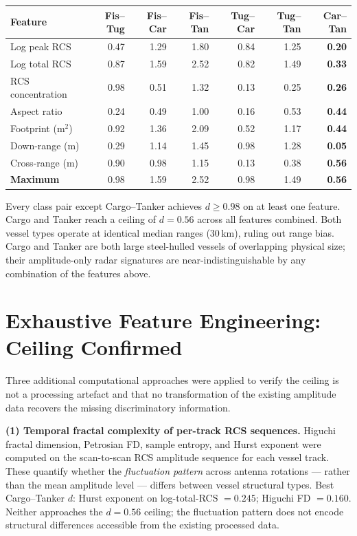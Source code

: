 \documentclass[10.5pt,a4paper]{article}
\begin{document}
\begin{center}\small
\begin{tabular}{lrrrrrr}
\toprule
Feature & Fis--Tug & Fis--Car & Fis--Tan & Tug--Car & Tug--Tan & \textbf{Car--Tan} \\
\midrule
Log peak RCS        & 0.47 & 1.29 & 1.80 & 0.84 & 1.25 & \textbf{0.20} \\
Log total RCS       & 0.87 & 1.59 & 2.52 & 0.82 & 1.49 & \textbf{0.33} \\
RCS concentration   & 0.98 & 0.51 & 1.32 & 0.13 & 0.25 & \textbf{0.26} \\
Aspect ratio        & 0.24 & 0.49 & 1.00 & 0.16 & 0.53 & \textbf{0.44} \\
Footprint (m$^2$)  & 0.92 & 1.36 & 2.09 & 0.52 & 1.17 & \textbf{0.44} \\
Down-range (m)      & 0.29 & 1.14 & 1.45 & 0.98 & 1.28 & \textbf{0.05} \\
Cross-range (m)     & 0.90 & 0.98 & 1.15 & 0.13 & 0.38 & \textbf{0.56} \\
\midrule
\textbf{Maximum}    & 0.98 & 1.59 & 2.52 & 0.98 & 1.49 & \textbf{0.56} \\
\bottomrule
\end{tabular}
\end{center}

Every class pair except Cargo--Tanker achieves $d \geq 0.98$ on at least one feature.
Cargo and Tanker reach a ceiling of $d = 0.56$ across all features combined.
Both vessel types operate at identical median ranges (30\,km), ruling out range bias.
Cargo and Tanker are both large steel-hulled vessels of overlapping physical size;
their amplitude-only radar signatures are near-indistinguishable by any combination
of the features above.

\section{Exhaustive Feature Engineering: Ceiling Confirmed}

Three additional computational approaches were applied to verify the ceiling
is not a processing artefact and that no transformation of the existing
amplitude data recovers the missing discriminatory information.

\textbf{(1) Temporal fractal complexity of per-track RCS sequences.}
Higuchi fractal dimension, Petrosian FD, sample entropy, and Hurst exponent
were computed on the scan-to-scan RCS amplitude sequence for each vessel track.
These quantify whether the \emph{fluctuation pattern} across antenna rotations
— rather than the mean amplitude level — differs between vessel structural types.
Best Cargo--Tanker $d$: Hurst exponent on log-total-RCS $= 0.245$;
Higuchi FD $= 0.160$.
Neither approaches the $d = 0.56$ ceiling; the fluctuation pattern does not
encode structural differences accessible from the existing processed data.
\end{document}
